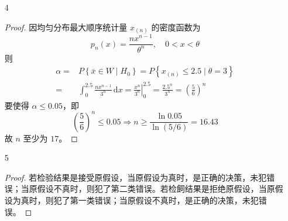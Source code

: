 \documentclass[normal,founder,mtpro2,cn]{elegantnote}
\begin{document}
\begin{enumerate}
\begin{proof}
        \end{proof}
    \item[4]
        \begin{proof}
            因均匀分布最大顺序统计量 $x_{(n)}$ 的密度函数为
            \begin{equation*}
                p_{n}(x)=\frac{nx^{n-1}}{\theta^{n}},\quad 0<x<\theta
            \end{equation*}
            则
            \begin{equation*}
                \begin{aligned}
                    \alpha= & P\left\{\bar{x}\in W\mid H_{0}\right\}=P\left\{x_{(n)}\leq 2.5\mid\theta=3\right\}                                                              \\
                    =       & \int_{0}^{2.5}\frac{nx^{n-1}}{3^{n}}\,\mathrm{d}x=\left.\frac{x^{n}}{3^{n}}\right|_{0}^{2.5}=\frac{2.5^{n}}{3^{n}}=\left(\frac{5}{6}\right)^{n}
                \end{aligned}
            \end{equation*}
            要使得 $\alpha\leq 0.05$，即
            \begin{equation*}
                \left(\frac{5}{6}\right)^{n}\leq 0.05\Rightarrow n\geq\frac{\ln 0.05}{\ln(5/6)}=16.43
            \end{equation*}
            故 $n$ 至少为 $17$。
        \end{proof}
    \item[5]
        \begin{proof}
            若检验结果是接受原假设，当原假设为真时，是正确的决策，未犯错误；当原假设不真时，则犯了第二类错误。若检飼结果是拒绝原假设，当原假设为真时，则犯了第一类错误；当原假设不真时，是正确的决策，未犯错误。
        \end{proof}
\end{enumerate}
\end{document}
